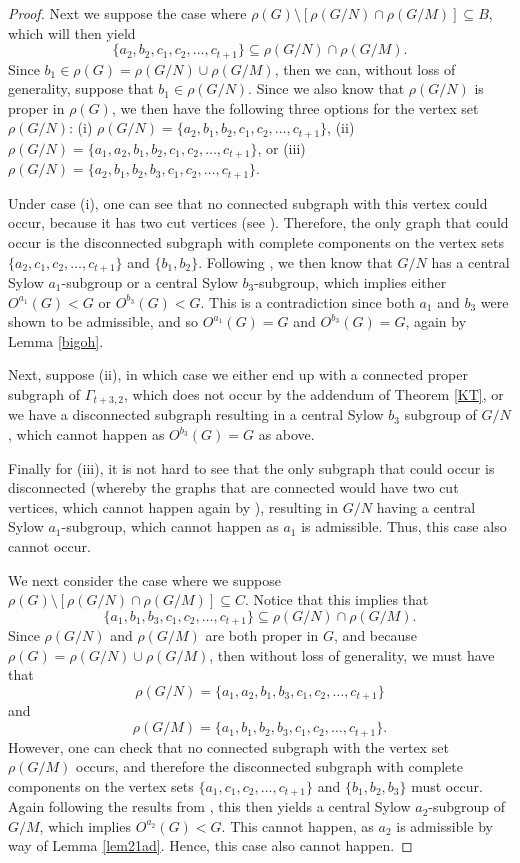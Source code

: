 \documentclass[10pt,a4paper]{amsart}
\begin{document}
\begin{proof}
Next we suppose the case where $\rho(G)\setminus[\rho(G/N)\cap\rho(G/M)]\subseteq B$, which will then yield
$$
\{a_2,b_2,c_1,c_2,\ldots,c_{t+1}\}\subseteq\rho(G/N)\cap\rho(G/M).
$$
Since $b_1\in\rho(G)=\rho(G/N)\cup\rho(G/M)$, then we can, without loss of generality, suppose that $b_1\in\rho(G/N)$. Since we also know that $\rho(G/N)$ is proper in $\rho(G)$, we then have the following three options for the vertex set $\rho(G/N)$: (i) $\rho(G/N)=\{a_2,b_1,b_2,c_1,c_2,\ldots,c_{t+1}\}$, (ii) $\rho(G/N)=\{a_1,a_2,b_1,b_2,c_1,c_2,\ldots,c_{t+1}\}$, or (iii) $\rho(G/N)=\{a_2,b_1,b_2,b_3,c_1,c_2,\ldots,c_{t+1}\}$.

Under case (i), one can see that no connected subgraph with this vertex could occur, because it has two cut vertices (see \cite{MQ}). Therefore, the only graph that could occur is the disconnected subgraph with complete components on the vertex sets $\{a_2,c_1,c_2,\ldots,c_{t+1}\}$ and $\{b_1,b_2\}$. Following \cite{L}, we then know that $G/N$ has a central Sylow $a_1$-subgroup or a central Sylow $b_3$-subgroup, which implies either $O^{a_1}(G)<G$ or $O^{b_3}(G)<G$. This is a contradiction since both $a_1$ and $b_3$ were shown to be admissible, and so $O^{a_1}(G)=G$ and $O^{b_3}(G)=G$, again by Lemma \ref{bigoh}.

Next, suppose (ii), in which case we either end up with a connected proper subgraph of $\Gamma_{t+3,2}$, which does not occur by the addendum of Theorem \ref{KT}, or we have a disconnected subgraph resulting in a central Sylow $b_3$ subgroup of $G/N$, which cannot happen as $O^{b_3}(G)=G$ as above.

Finally for (iii), it is not hard to see that the only subgraph that could occur is disconnected (whereby the graphs that are connected would have two cut vertices, which cannot happen again by \cite{MQ}), resulting in $G/N$ having a central Sylow $a_1$-subgroup, which cannot happen as $a_1$ is admissible. Thus, this case also cannot occur.

We next consider the case where we suppose $\rho(G)\setminus[\rho(G/N)\cap\rho(G/M)]\subseteq C$. Notice that this implies that
$$
\{a_1,b_1,b_3,c_1,c_2,\ldots,c_{t+1}\}\subseteq\rho(G/N)\cap\rho(G/M).
$$
Since $\rho(G/N)$ and $\rho(G/M)$ are both proper in $G$, and because $\rho(G)=\rho(G/N)\cup\rho(G/M)$, then without loss of generality, we must have that
$$
\rho(G/N)=\{a_1,a_2,b_1,b_3,c_1,c_2,\ldots,c_{t+1}\}
$$
and
$$
\rho(G/M)=\{a_1,b_1,b_2,b_3,c_1,c_2,\ldots,c_{t+1}\}.
$$
However, one can check that no connected subgraph with the vertex set $\rho(G/M)$ occurs, and therefore the disconnected subgraph with complete components on the vertex sets $\{a_1,c_1,c_2,\ldots,c_{t+1}\}$ and $\{b_1,b_2,b_3\}$ must occur. Again following the results from \cite{L}, this then yields a central Sylow $a_2$-subgroup of $G/M$, which implies $O^{a_2}(G)<G$. This cannot happen, as $a_2$ is admissible by way of Lemma \ref{lem21ad}. Hence, this case also cannot happen.


\end{proof}
\end{document}

